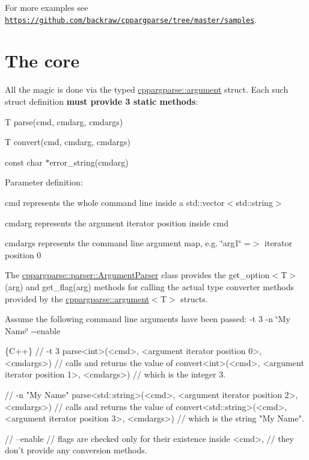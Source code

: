 For more examples see \href{https://github.com/backraw/cppargparse/tree/master/samples}{\tt https\+://github.\+com/backraw/cppargparse/tree/master/samples}.

\section*{The core}

All the magic is done via the typed {\ttfamily \hyperlink{structcppargparse_1_1argument}{cppargparse\+::argument}} struct. Each such struct definition {\bfseries must provide 3 static methods}\+:
\begin{DoxyItemize}
\item {\ttfamily T parse(cmd, cmdarg, cmdargs)}
\item {\ttfamily T convert(cmd, cmdarg, cmdargs)}
\item {\ttfamily const char $\ast$error\+\_\+string(cmdarg)}
\end{DoxyItemize}

Parameter definition\+:
\begin{DoxyItemize}
\item {\ttfamily cmd} represents the whole command line inside a {\ttfamily std\+::vector$<$std\+::string$>$}
\item {\ttfamily cmdarg} represents the argument iterator position inside {\ttfamily cmd}
\item {\ttfamily cmdargs} represents the command line argument map, e.\+g. {\ttfamily \char`\"{}arg1\char`\"{} =$>$ iterator position 0}
\end{DoxyItemize}

The {\ttfamily \hyperlink{classcppargparse_1_1parser_1_1ArgumentParser}{cppargparse\+::parser\+::\+Argument\+Parser}} class provides the {\ttfamily get\+\_\+option$<$T$>$(arg)} and {\ttfamily get\+\_\+flag(arg)} methods for calling the actual type converter methods provided by the {\ttfamily \hyperlink{structcppargparse_1_1argument}{cppargparse\+::argument}$<$T$>$} structs.

Assume the following command line arguments have been passed\+: {\ttfamily -\/t 3 -\/n \char`\"{}\+My Name\char`\"{} -\/-\/enable} 
\begin{DoxyCode}
\{C++\}
// -t 3
parse<int>(<cmd>, <argument iterator position 0>, <cmdargs>)
// calls and returns the value of
convert<int>(<cmd>, <argument iterator position 1>, <cmdargs>)
// which is the integer 3.


// -n "My Name"
parse<std::string>(<cmd>, <argument iterator position 2>, <cmdargs>)
// calls and returns the value of
convert<std::string>(<cmd>, <argument iterator position 3>, <cmdargs>)
// which is the string "My Name".


// --enable
// flags are checked only for their existence inside <cmd>,
// they don't provide any conversion methods.
\end{DoxyCode}


